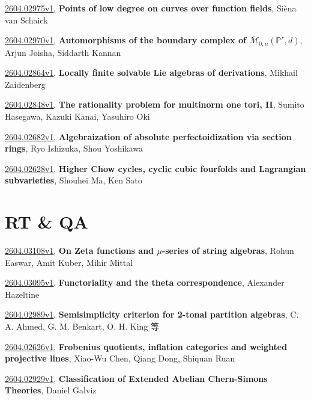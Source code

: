 \documentclass[9pt, a4paper]{article}
\theoremstyle{plain}
\theoremstyle{definition}
\theoremstyle{remark}
\newcommand{\arxiv}[3]{\href{https://arxiv.org/abs/#1}{#1}, \textbf{\textcolor{arxivblue}{#2}}, #3}
\begin{document}
\arxiv{2604.02975v1}{Points of low degree on curves over function fields}{Sièna van Schaick}

\arxiv{2604.02970v1}{Automorphisms of the boundary complex of $\overline{\mathcal{M}}_{0, n}(\mathbb{P}^r, d)$}{Arjun Joisha, Siddarth Kannan}

\arxiv{2604.02864v1}{Locally finite solvable Lie algebras of derivations}{Mikhail Zaidenberg}

\arxiv{2604.02848v1}{The rationality problem for multinorm one tori, II}{Sumito Hasegawa, Kazuki Kanai, Yasuhiro Oki}

\arxiv{2604.02682v1}{Algebraization of absolute perfectoidization via section rings}{Ryo Ishizuka, Shou Yoshikawa}

\arxiv{2604.02628v1}{Higher Chow cycles, cyclic cubic fourfolds and Lagrangian subvarieties}{Shouhei Ma, Ken Sato}


\section{RT \& QA}
\arxiv{2604.03108v1}{On Zeta functions and $μ$-series of string algebras}{Rohun Easwar, Amit Kuber, Mihir Mittal}

\arxiv{2604.03095v1}{Functoriality and the theta correspondence}{Alexander Hazeltine}

\arxiv{2604.02989v1}{Semisimplicity criterion for 2-tonal partition algebras}{C. A. Ahmed, G. M. Benkart, O. H. King 等}

\arxiv{2604.02626v1}{Frobenius quotients, inflation categories and weighted projective lines}{Xiao-Wu Chen, Qiang Dong, Shiquan Ruan}

\arxiv{2604.02929v1}{Classification of Extended Abelian Chern-Simons Theories}{Daniel Galviz}

\end{document}

